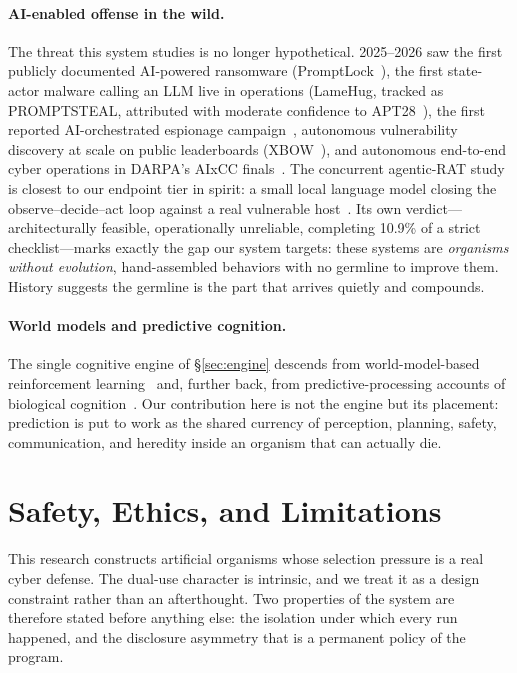 \documentclass[11pt,a4paper]{article}
\begin{document}
\paragraph{AI-enabled offense in the wild.} The threat this system studies is no longer hypothetical. 2025--2026 saw the first publicly documented AI-powered ransomware (PromptLock~\cite{eset2025promptlock}), the first state-actor malware calling an LLM live in operations (LameHug, tracked as PROMPTSTEAL, attributed with moderate confidence to APT28~\cite{certua2025lamehug,gtig2025ai}), the first reported AI-orchestrated espionage campaign~\cite{anthropic2025espionage}, autonomous vulnerability discovery at scale on public leaderboards (XBOW~\cite{xbow2025}), and autonomous end-to-end cyber operations in DARPA's AIxCC finals~\cite{aixcc2025}. The concurrent agentic-RAT study is closest to our endpoint tier in spirit: a small local language model closing the observe--decide--act loop against a real vulnerable host~\cite{you2026agenticrat}. Its own verdict---architecturally feasible, operationally unreliable, completing 10.9\% of a strict checklist---marks exactly the gap our system targets: these systems are \emph{organisms without evolution}, hand-assembled behaviors with no germline to improve them. History suggests the germline is the part that arrives quietly and compounds.

\paragraph{World models and predictive cognition.} The single cognitive engine of \S\ref{sec:engine} descends from world-model-based reinforcement learning~\cite{ha2018worldmodels,hafner2020dream} and, further back, from predictive-processing accounts of biological cognition~\cite{friston2010freeenergy,clark2013predictive}. Our contribution here is not the engine but its placement: prediction is put to work as the shared currency of perception, planning, safety, communication, and heredity inside an organism that can actually die.

\section{Safety, Ethics, and Limitations}
\label{sec:ethics}

This research constructs artificial organisms whose selection pressure is a real cyber defense. The dual-use character is intrinsic, and we treat it as a design constraint rather than an afterthought. Two properties of the system are therefore stated before anything else: the isolation under which every run happened, and the disclosure asymmetry that is a permanent policy of the program.
\end{document}
